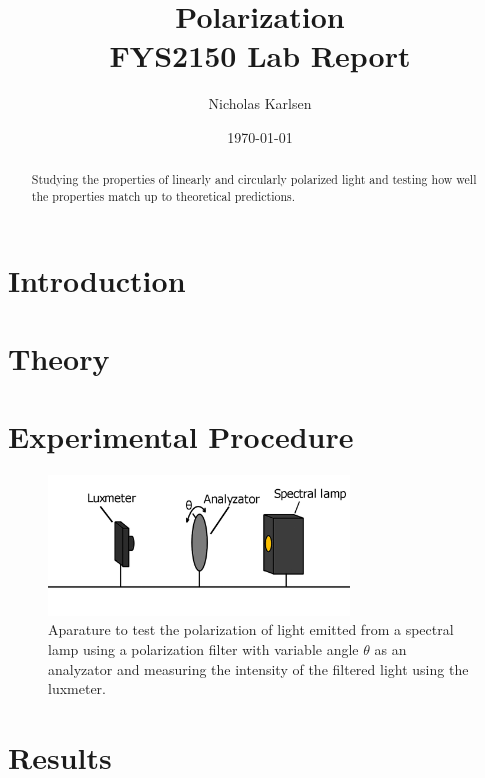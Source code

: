 \documentclass[11pt,a4paper]{article}
\begin{document}
\title{Polarization\\
\normalsize{FYS2150 Lab Report}\\}

\author{Nicholas Karlsen}

\date{\today}%

\maketitle
\begin{abstract}
  Studying the properties of linearly and circularly polarized light and testing how well the properties match up to theoretical predictions.
\end{abstract}
\twocolumn


\section{\label{sect:intro}Introduction}
  

\section{\label{sect:theory}Theory}

\section{\label{section:experimental}Experimental Procedure} 

  \begin{figure}[H]
    \center
    \includegraphics[width=8cm]{scripts/figs/diagram_1.png}
    \caption{Aparature to test the polarization of light emitted from a spectral lamp using a polarization filter with variable angle $\theta$ as an analyzator and measuring the intensity of the filtered light using the luxmeter.}
    \label{fig:lux_ana_lamp}
  \end{figure}

\section{\label{sect:results}Results}
  
\end{document}
